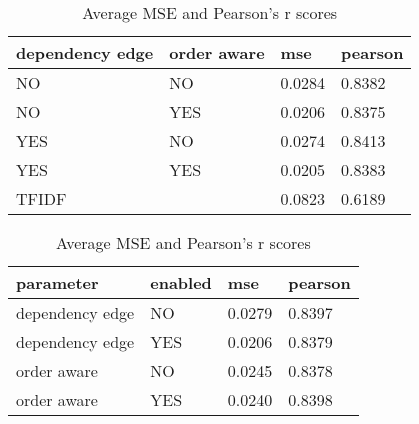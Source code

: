 \begin{table}[htb!]
  \centering
  \begin{subtable}[c]{\textwidth}
  	\centering
    \begin{tabularx}{\textwidth}{|X X|X|X|}
      \hline
      dependency edge & order aware & mse & pearson \\ \hline \hline
      NO & NO & 0.0284 & 0.8382 \\ 
      NO & YES & 0.0206 & 0.8375 \\
      YES & NO & 0.0274 & 0.8413 \\
      YES & YES & 0.0205 & 0.8383 \\ \hline
      \multicolumn{2}{|l|}{TFIDF} & 0.0823 & 0.6189 \\ \hline
    \end{tabularx}
    \caption{scores aggregated by setting}
    \label{tab:results}
  \end{subtable}
  \vspace*{0.8 cm} \newline
  \begin{subtable}[c]{\textwidth}
    \centering
      \begin{tabularx}{\textwidth}{|X X|X|X|} 
        \hline
        parameter & enabled & mse & pearson \\ \hline \hline
        dependency edge & NO & 0.0279 & 0.8397 \\
        dependency edge & YES & 0.0206 & 0.8379 \\ \hline
        order aware & NO & 0.0245 & 0.8378 \\
        order aware & YES & 0.0240 & 0.8398 \\ \hline
      \end{tabularx}
    \caption{scores aggregated by individual parameter assignment}
    \label{tab:results_merged}
  \end{subtable}
  \caption{Average \ac{MSE} and Pearson's r scores}
\end{table}



